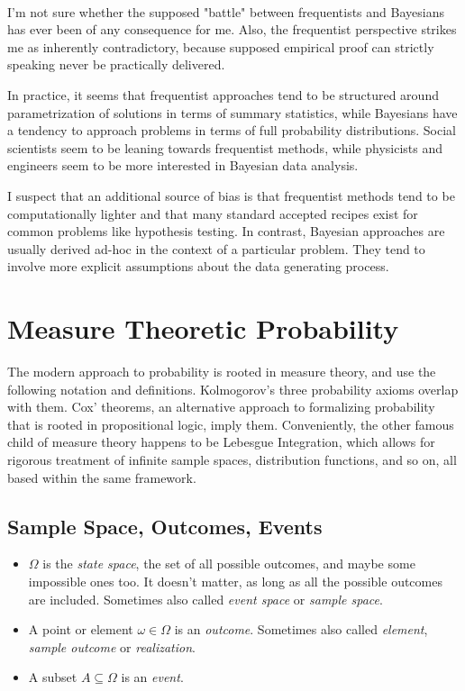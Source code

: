 \paragraph{} I'm not sure whether the supposed "battle" between frequentists and Bayesians has ever been of any consequence for me. Also, the frequentist perspective strikes me as inherently contradictory, because supposed empirical proof can strictly speaking never be practically delivered.

In practice, it seems that frequentist approaches tend to be structured around parametrization of solutions in terms of summary statistics, while Bayesians have a tendency to approach problems in terms of full probability distributions. Social scientists seem to be leaning towards frequentist methods, while physicists and engineers seem to be more interested in Bayesian data analysis. 

I suspect that an additional source of bias is that frequentist methods tend to be computationally lighter and that many standard accepted recipes exist for common problems like hypothesis testing. In contrast, Bayesian approaches are usually derived ad-hoc in the context of a particular problem. They tend to involve more explicit assumptions about the data generating process.

\section{Measure Theoretic Probability}
The modern approach to probability is rooted in measure theory, and use the following notation and definitions. Kolmogorov's three probability axioms overlap with them. Cox' theorems, an alternative approach to formalizing probability that is rooted in propositional logic, imply them. Conveniently, the other famous child of measure theory happens to be Lebesgue Integration, which allows for rigorous treatment of infinite sample spaces, distribution functions, and so on, all based within the same framework. 

\subsection{Sample Space, Outcomes, Events}

\begin{itemize}
\item $\Omega$ is the \textit{state space}, the set of all possible outcomes, and maybe some impossible ones too. It doesn't matter, as long as all the possible outcomes are included. Sometimes also called \textit{event space} or \textit{sample space}. 
\item A point or element $\omega \in \Omega$ is an \textit{outcome}. Sometimes also called \textit{element}, \textit{sample outcome} or \textit{realization}. 
\item A subset $A \subseteq \Omega$ is an \textit{event}. 
\end{itemize}

